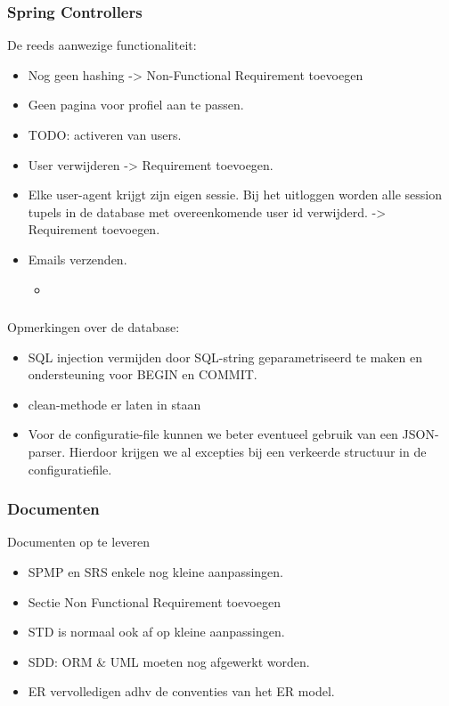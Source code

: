 \subsubsection{Spring Controllers}
De reeds aanwezige functionaliteit:
\begin{itemize}
	\item Nog geen hashing -> Non-Functional Requirement toevoegen
	\item Geen pagina voor profiel aan te passen.
	\item TODO: activeren van users.
	\item User verwijderen -> Requirement toevoegen.
	\item Elke user-agent krijgt zijn eigen sessie. Bij het uitloggen worden alle session tupels in de database met overeenkomende user id verwijderd. -> Requirement toevoegen.
	\item 
	{
		Emails verzenden.
		\begin{itemize}
			\item 
		\end{itemize}
	
	}
	
\end{itemize}

\subsubsection{}
Opmerkingen over de database:
\begin{itemize}
	\item SQL injection vermijden door SQL-string geparametriseerd te maken en ondersteuning voor BEGIN en COMMIT.
	\item clean-methode er laten in staan
	\item Voor de configuratie-file kunnen we beter eventueel gebruik van een JSON-parser. Hierdoor krijgen we al excepties bij een verkeerde structuur in de configuratiefile.
\end{itemize}

\subsubsection{Documenten}
Documenten op te leveren
\begin{itemize}
	\item SPMP en SRS enkele nog kleine aanpassingen.
	\item Sectie Non Functional Requirement toevoegen
	\item STD is normaal ook af op kleine aanpassingen. 
	\item SDD: ORM & UML moeten nog afgewerkt worden.
	\item ER vervolledigen adhv de conventies van het ER model.
\end{itemize}

